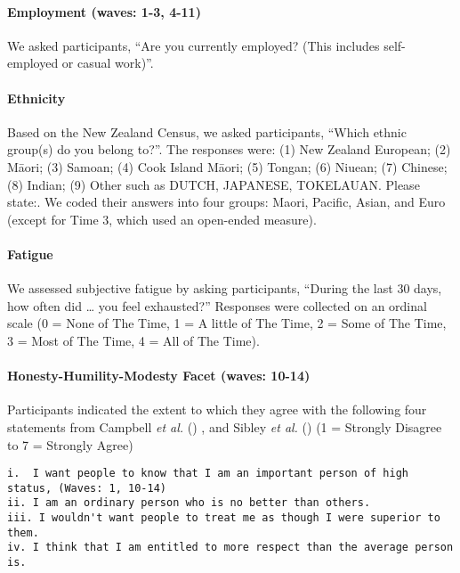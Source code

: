 \documentclass[
  single column]{article}
\let\oldparagraph\paragraph
\renewcommand{\paragraph}[1]{\oldparagraph{#1}\mbox{}}
\begin{document}
\paragraph{Employment (waves: 1-3,
4-11)}\label{employment-waves-1-3-4-11}

We asked participants, ``Are you currently employed? (This includes
self-employed or casual work)''.

\paragraph{Ethnicity}\label{ethnicity}

Based on the New Zealand Census, we asked participants, ``Which ethnic
group(s) do you belong to?''. The responses were: (1) New Zealand
European; (2) Māori; (3) Samoan; (4) Cook Island Māori; (5) Tongan; (6)
Niuean; (7) Chinese; (8) Indian; (9) Other such as DUTCH, JAPANESE,
TOKELAUAN. Please state:. We coded their answers into four groups:
Maori, Pacific, Asian, and Euro (except for Time 3, which used an
open-ended measure).

\paragraph{Fatigue}\label{fatigue}

We assessed subjective fatigue by asking participants, ``During the last
30 days, how often did \ldots{} you feel exhausted?'' Responses were
collected on an ordinal scale (0 = None of The Time, 1 = A little of The
Time, 2 = Some of The Time, 3 = Most of The Time, 4 = All of The Time).

\paragraph{Honesty-Humility-Modesty Facet (waves:
10-14)}\label{honesty-humility-modesty-facet-waves-10-14}

Participants indicated the extent to which they agree with the following
four statements from Campbell \emph{et al.}
() , and Sibley \emph{et al.}
() (1 = Strongly Disagree to 7 = Strongly
Agree)

\begin{verbatim}
i.  I want people to know that I am an important person of high status, (Waves: 1, 10-14)
ii. I am an ordinary person who is no better than others.
iii. I wouldn't want people to treat me as though I were superior to them.
iv. I think that I am entitled to more respect than the average person is.
\end{verbatim}
\end{document}
